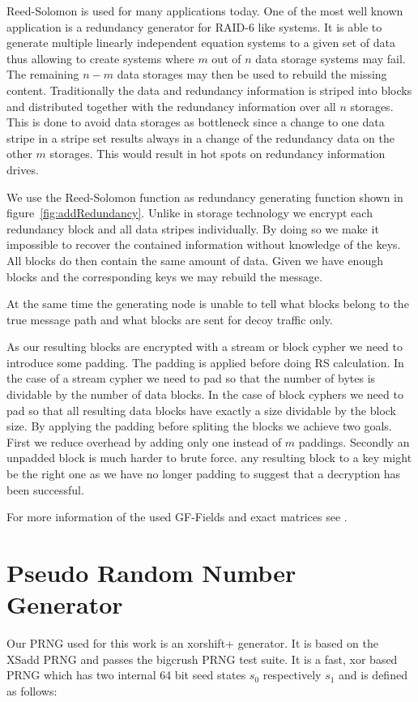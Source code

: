 \documentclass[9pt,journal,compsoc]{IEEEtran}
\begin{document}
Reed-Solomon is used for many applications today. One of the most well known application is a redundancy generator for RAID-6 like systems. It is able to generate multiple linearly independent equation systems to a given set of data thus allowing to create systems where $m$ out of $n$ data storage systems may fail. The remaining  $n-m$ data storages may then be used to rebuild the missing content. Traditionally the data and redundancy information is striped into blocks and distributed together with the redundancy information over all $n$ storages. This is done to avoid data storages as bottleneck since a change to one data stripe  in a stripe set results always in a change of the redundancy data on the other $m$ storages. This would result in hot spots on redundancy information drives.

We use the Reed-Solomon function as redundancy generating function shown in figure~\ref{fig:addRedundancy}. Unlike in storage technology we encrypt each redundancy block and all data stripes individually. By doing so we make it impossible to recover the contained information without knowledge of the keys. All blocks do then contain the same amount of data. Given we have enough blocks and the corresponding keys we may rebuild the message. 

At the same time the generating node is unable to tell what blocks belong to the true message path and what blocks are sent for decoy traffic only. 

As our resulting blocks are encrypted with a stream or block cypher we need to introduce some padding. The padding is applied before doing RS calculation. In the case of a stream cypher we need to pad so that the number of bytes is dividable by the number of data blocks. In the case of block cyphers we need to pad so that all resulting data blocks have exactly a size dividable by the block size. By applying the padding before spliting the blocks we achieve two goals. First we reduce overhead by adding only one instead of $m$ paddings. Secondly an unpadded block is much harder to brute force. any resulting block to a key might be the right one as we have no longer padding to suggest that a decryption has been successful.

For more information of the used GF-Fields and exact matrices see \cite{messageVortex}.

\section{Pseudo Random Number Generator\label{sec:prng}}
Our PRNG used for this work is an xorshift+ generator. It is based on the XSadd PRNG\cite{marsaglia2003xorshift} and passes the bigcrush PRNG test suite. It is a fast, xor based PRNG which has two internal 64 bit seed states $s_0$ respectively $s_1$ and is defined as follows:
\end{document}
